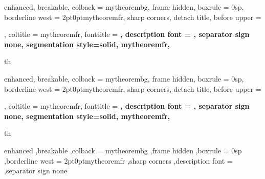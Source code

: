 

\newcommand{\fspace}[1]{\vspace{#1}\newline}
\newcommand{\fchapter}[2]{
  \newpage
  \phantomsection
  \setcounter{chapter}{#1}
\setcounter{section}{0}
\addcontentsline{toc}{chapter}{#2}
}







\setlength{\parindent}{1cm}

{%
	enhanced,
	breakable,
	colback = mytheorembg,
	frame hidden,
	boxrule = 0sp,
	borderline west = {2pt}{0pt}{mytheoremfr},
	sharp corners,
	detach title,
	before upper = \tcbtitle\par\smallskip,
	coltitle = mytheoremfr,
	fonttitle = \bfseries\sffamily,
	description font = \mdseries,
	separator sign none,
	segmentation style={solid, mytheoremfr},
}
{th}

{%
	enhanced,
	breakable,
	colback = mytheorembg,
	frame hidden,
	boxrule = 0sp,
	borderline west = {2pt}{0pt}{mytheoremfr},
	sharp corners,
	detach title,
	before upper = \tcbtitle\par\smallskip,
	coltitle = mytheoremfr,
	fonttitle = \bfseries\sffamily,
	description font = \mdseries,
	separator sign none,
	segmentation style={solid, mytheoremfr},
}
{th}


{%
	enhanced
	,breakable
	,colback = mytheorembg
	,frame hidden
	,boxrule = 0sp
	,borderline west = {2pt}{0pt}{mytheoremfr}
	,sharp corners
	,description font = \mdseries
	,separator sign none
}

